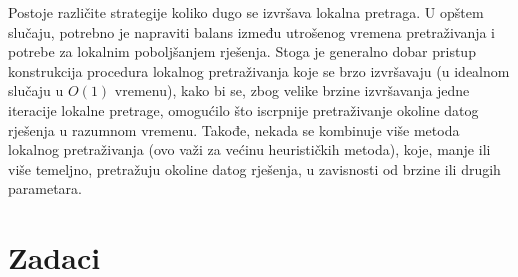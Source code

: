 \documentclass[a4paper, utf8, 11pt, colorlinks]{book}
\theoremstyle{definition}
\begin{document}
Postoje različite strategije koliko dugo se izvršava lokalna pretraga. U opštem slučaju, potrebno je napraviti balans između utrošenog vremena pretraživanja i potrebe za lokalnim poboljšanjem rješenja. Stoga je generalno dobar pristup konstrukcija  procedura lokalnog pretraživanja koje se brzo izvršavaju (u idealnom slučaju u $O(1)$ vremenu), kako bi se, zbog velike brzine izvršavanja jedne iteracije lokalne pretrage, omogućilo što iscrpnije pretraživanje okoline datog rješenja u razumnom vremenu. Takođe, nekada se kombinuje više metoda lokalnog pretraživanja (ovo važi za većinu heurističkih metoda), koje, manje ili više temeljno, pretražuju okoline datog rješenja, u zavisnosti od brzine ili drugih parametara.



\section{Zadaci}
\end{document}
